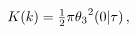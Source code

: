 $\mathop{K\/}\nolimits\!\left(k\right)=\tfrac{1}{2}\pi{\mathop{\theta_{3}\/}%
\nolimits^{2}}\!\left(0\middle|\tau\right),$